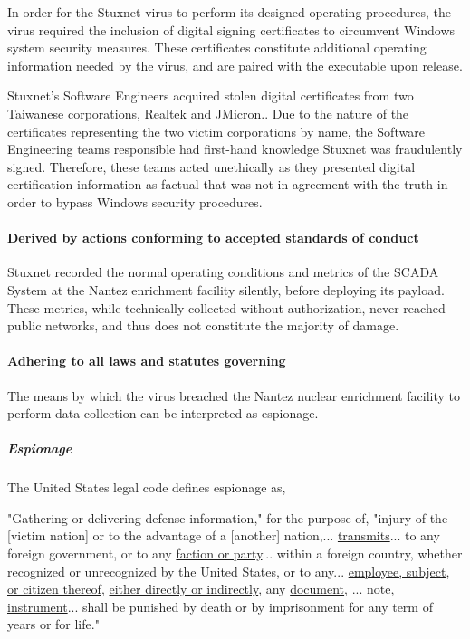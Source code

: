 \documentclass[12pt]{article}
\begin{document}
\begin{multicols}{2}
In order for the Stuxnet virus to perform its designed operating procedures, the virus required the inclusion of digital signing certificates to circumvent Windows system security measures. These certificates constitute additional operating information needed by the virus, and are paired with the executable upon release.

Stuxnet's Software Engineers acquired stolen digital certificates from two Taiwanese corporations, Realtek and JMicron.\cite{signedUsingCertificates}. Due to the nature of the certificates representing the two victim corporations by name, the Software Engineering teams responsible had first-hand knowledge Stuxnet was fraudulently signed. Therefore, these teams acted unethically as they presented digital certification information as factual that was not in agreement with the truth in order to bypass Windows security procedures.

\paragraph{Derived by actions conforming to accepted standards of conduct}

Stuxnet recorded the normal operating conditions and metrics of the SCADA System at the Nantez enrichment facility silently, before deploying its payload. These metrics, while technically collected without authorization, never reached public networks, and thus does not constitute the majority of damage.

\paragraph{Adhering to all laws and statutes governing}

The means by which the virus breached the Nantez nuclear enrichment facility to perform data collection can be interpreted as espionage.

\subparagraph{Espionage}

The United States legal code defines espionage as,

\begin{displayquote}
"Gathering or delivering defense information," for the purpose of, "injury of the [victim nation] or to the advantage of a [another] nation,... \ul{transmits}... to any foreign government, or to any \ul{faction or party}... within a foreign country, whether recognized or unrecognized by the United States, or to any... \ul{employee, subject, or citizen thereof}, \ul{either directly or indirectly}, any \ul{document}, ... note, \ul{instrument}... shall be punished by death or by imprisonment for any term of years or for life."\cite{USEspionageLegalDefinition}
\end{displayquote}


\end{multicols}
\end{document}
